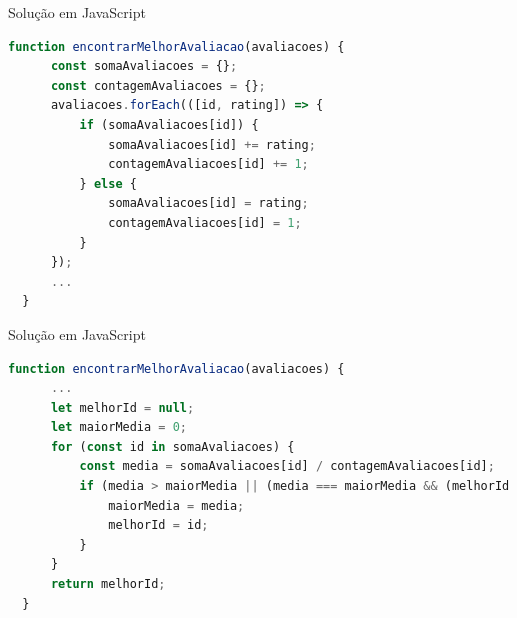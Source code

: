 \begin{frame}[fragile]{Solução em JavaScript}
  \begin{lstlisting}[language=JavaScript]
  function encontrarMelhorAvaliacao(avaliacoes) {
      const somaAvaliacoes = {};
      const contagemAvaliacoes = {};
      avaliacoes.forEach(([id, rating]) => {
          if (somaAvaliacoes[id]) {
              somaAvaliacoes[id] += rating;
              contagemAvaliacoes[id] += 1;
          } else {
              somaAvaliacoes[id] = rating;
              contagemAvaliacoes[id] = 1;
          }
      });
      ...
  }
  \end{lstlisting}
\end{frame}
\begin{frame}[fragile]{Solução em JavaScript}
  \begin{lstlisting}[language=JavaScript]
  function encontrarMelhorAvaliacao(avaliacoes) {
      ...
      let melhorId = null;
      let maiorMedia = 0;
      for (const id in somaAvaliacoes) {
          const media = somaAvaliacoes[id] / contagemAvaliacoes[id];
          if (media > maiorMedia || (media === maiorMedia && (melhorId === null || parseInt(id) < melhorId))) {
              maiorMedia = media;
              melhorId = id;
          }
      }
      return melhorId;
  }
  \end{lstlisting}
  \end{frame}
  
